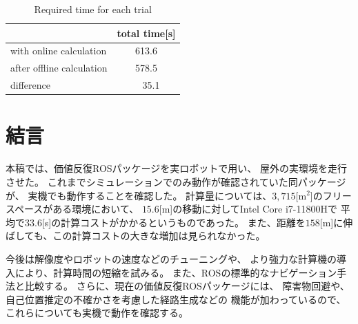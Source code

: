 \documentclass{jarticle}
\begin{document}
\begin{table}[hbtp]
	\caption{Required time for each trial}
	\label{table:result2}
	\centering
	\begin{small}
	 \begin{tabular}{l|c}
		\hline
		 & total time[s] \\
		\hline \hline
		with online calculation & 613.6 \\
		after offline calculation & 578.5 \\
		\hline
		 difference & \ \ 35.1 \\
		\hline
	 \end{tabular}
	\end{small}
\end{table}


\section{結言}%

本稿では、価値反復ROSパッケージを実ロボットで用い、
屋外の実環境を走行させた。
これまでシミュレーションでのみ動作が確認されていた同パッケージが、
実機でも動作することを確認した。
計算量については、$3,715$[m$^2$]のフリースペースがある環境において、
$15.6$[m]の移動に対してIntel Core i7-11800Hで
平均で$33.6$[s]の計算コストがかかるというものであった。
また、距離を$158$[m]に伸ばしても、この計算コストの大きな増加は見られなかった。

今後は解像度やロボットの速度などのチューニングや、
より強力な計算機の導入により、計算時間の短縮を試みる。
また、ROSの標準的なナビゲーション手法と比較する。
さらに、現在の価値反復ROSパッケージには、
障害物回避\cite{上田rsj2022}や、
自己位置推定の不確かさを考慮した経路生成\cite{上田robosym2023}などの
機能が加わっているので、これらについても実機で動作を確認する。
\end{document}
